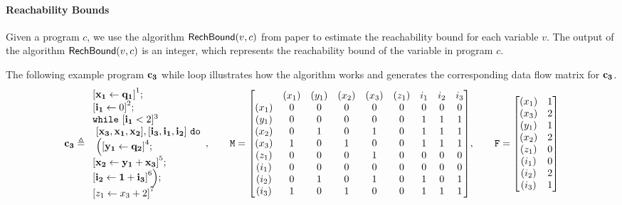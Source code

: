 \documentclass[a4paper,11pt]{article}
\begin{document}
\paragraph{Reachability Bounds}
Given a program $c$, we use the algorithm $\mathsf{RechBound}(v, c)$ from paper \cite{10.1145/1806596.1806630} to estimate the reachability bound for each variable $v$. 
The output of the algorithm $\mathsf{RechBound}(v, c)$ is an integer, which represents the reachability bound of the variable in program $c$.


The following example program $\mathbf{{c_3}}$ while loop illustrates how the algorithm works and generates the corresponding 
data flow matrix for $\mathbf{{c_3}}$.
%
\[
{\ssa{c_3} \triangleq
\begin{array}{l}
     \left[\ssa{ x_1 \leftarrow q_1}  \right]^1 ; \\
     \left[\ssa{i_1} \leftarrow 0 \right]^2 ; \\
    \ewhile
     ~ [\ssa{i_1} < 2]^3
  \\
     ~\ssa{[ x_3,x_1 ,x_2 ], [i_3, i_1, i_2] }
     ~ \edo \\
    ~ \Big( 
    \left[\ssa{ y_1 \leftarrow q_2} \right]^4; \\
    \left[\ssa{x_2 \leftarrow y_1  + x_3 } \right]^5;\\
    \left[\ssa{i_2 \leftarrow 1  + i_3 } \right]^6
    \Big) ; \\
     \left[ \assign{z_1}{x_3 + 2}  \right]^{7}
\end{array}
,
~~~~~~
\Mtrix =  \left[ \begin{matrix}
 & (x_1)  & (y_1) & (x_2) & (x_3) &  (z_1) & i_1 & i_2 & i_3\\
(x_1) & 0 & 0 & 0 & 0 & 0 & 0 & 0 & 0 \\
(y_1) & 0 & 0 & 0 & 0 & 0 & 1 & 1 & 1\\
(x_2) & 0 & 1 & 0 & 1 & 0 & 1 & 1 & 1\\
(x_3) & 1 & 0  & 1& 0 & 0 & 1 & 1 & 1\\
(z_1) & 0 & 0 & 0 & 1 & 0 & 0 & 0 & 0 \\
(i_1) & 0 & 0 & 0 & 0 & 0 & 0 & 0 & 0\\
(i_2) & 0 & 1 & 0 & 1 & 0 & 1 & 0 & 1\\
(i_3) & 1 & 0  & 1& 0 & 0 & 1 & 1 & 1\\
\end{matrix} \right]
,
~~~~~~
\flag = \left [ \begin{matrix}
(x_1) & 1 \\
(x_3) & 2 \\
(y_1) & 1 \\
(x_2) & 2 \\
(z_1) & 0 \\
(i_1) & 0 \\
(i_2) & 2 \\
(i_3) & 1 
\end{matrix} \right ]
}
\]
\end{document}
